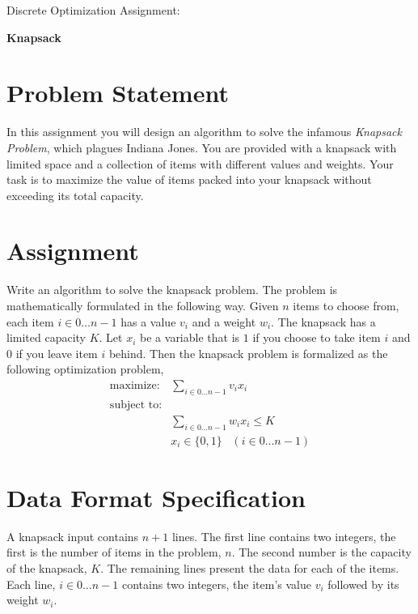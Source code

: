 \documentclass[11pt]{article}
\begin{document}
\huge
\noindent
{Discrete Optimization Assignment:}
\vspace{0.25cm}

\noindent
{\bf Knapsack}
\normalsize


\section{Problem Statement}

In this assignment you will design an algorithm to solve the infamous {\em Knapsack Problem}, which plagues Indiana Jones.  You are provided with a knapsack with limited space and a collection of items with different values and weights.  Your task is to maximize the value of items packed into your knapsack without exceeding its total capacity.

\section{Assignment}

Write an algorithm to solve the knapsack problem.  The problem is mathematically formulated in the following way.  Given $n$ items to choose from, each item $i \in 0 \ldots n-1$ has a value $v_i$ and a weight $w_i$.  The knapsack has a limited capacity $K$.  Let $x_i$ be a variable that is $1$ if you choose to take item $i$ and $0$ if you leave item $i$ behind. Then the knapsack problem is formalized as the following optimization problem,
$$
\begin{array}{ll}
\mbox{maximize:} & \displaystyle \sum_{i \in 0 \ldots n-1} v_i x_i \\
\mbox{subject to:} & \\
     & \displaystyle \sum_{i \in 0 \ldots n-1} w_i x_i \leq K \\
     & x_i \in \{0,1\} \;\;\; (i \in 0 \ldots n-1)
\end{array}
$$

\section{Data Format Specification}

A knapsack input contains $n+1$ lines.  The first line contains two integers, the first is the number of items in the problem, $n$.  The second number is the capacity of the knapsack, $K$.  The remaining lines present the data for each of the items.  Each line, $i \in 0 \ldots n-1$ contains two integers, the item's value $v_i$ followed by its weight $w_i$.
\end{document}
